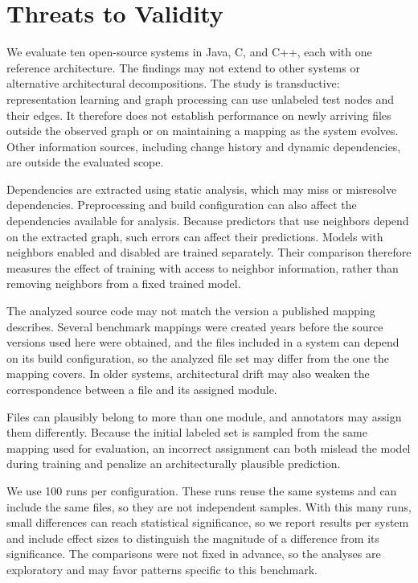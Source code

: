 \section{Threats to Validity\label{sec:threats}}

 We evaluate ten open-source systems in Java, C, and C++, each with one reference architecture. The findings may not extend to other systems or alternative architectural decompositions. The study is transductive: representation learning and graph processing can use unlabeled test nodes and their edges. It therefore does not establish performance on newly arriving files outside the observed graph or on maintaining a mapping as the system evolves. Other information sources, including change history and dynamic dependencies, are outside the evaluated scope.

 Dependencies are extracted using static analysis, which may miss or misresolve dependencies. Preprocessing and build configuration can also affect the dependencies available for analysis. Because predictors that use neighbors depend on the extracted graph, such errors can affect their predictions. Models with neighbors enabled and disabled are trained separately. Their comparison therefore measures the effect of training with access to neighbor information, rather than removing neighbors from a fixed trained model.

The analyzed source code may not match the version a published mapping describes. Several benchmark mappings were created years before the source versions used here were obtained, and the files included in a system can depend on its build configuration, so the analyzed file set may differ from the one the mapping covers. In older systems, architectural drift may also weaken the correspondence between a file and its assigned module.

Files can plausibly belong to more than one module, and annotators may assign them differently. Because the initial labeled set is sampled from the same mapping used for evaluation, an incorrect assignment can both mislead the model during training and penalize an architecturally plausible prediction.

 We use 100 runs per configuration. These runs reuse the same systems and can include the same files, so they are not independent samples. With this many runs, small differences can reach statistical significance, so we report results per system and include effect sizes to distinguish the magnitude of a difference from its significance. The comparisons were not fixed in advance, so the analyses are exploratory and may favor patterns specific to this benchmark.

